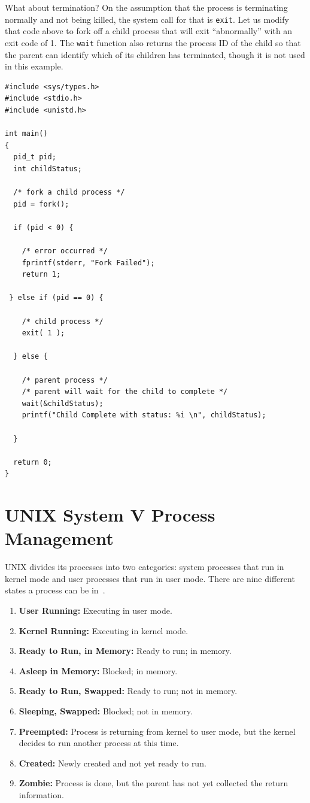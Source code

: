 What about termination? On the assumption that the process is terminating normally and not being killed, the system call for that is \texttt{exit}. Let us modify that code above to fork off a child process that will exit ``abnormally'' with an exit code of 1. The \texttt{wait} function also returns the process ID of the child so that the parent can identify which of its children has terminated, though it is not used in this example.


\begin{verbatim}
#include <sys/types.h>
#include <stdio.h> 
#include <unistd.h>

int main()
{
  pid_t pid;
  int childStatus;

  /* fork a child process */
  pid = fork();
  
  if (pid < 0) { 
  
    /* error occurred */ 
    fprintf(stderr, "Fork Failed"); 
    return 1;
    
 } else if (pid == 0) { 
    
    /* child process */
    exit( 1 );
    
  } else { 
    
    /* parent process */
    /* parent will wait for the child to complete */
    wait(&childStatus);
    printf("Child Complete with status: %i \n", childStatus);
    
  }
    
  return 0;
}
\end{verbatim}

\section*{UNIX System V Process Management}

UNIX divides its processes into two categories: system processes that run in kernel mode and user processes that run in user mode. There are nine different states a process can be in~\cite{osi}.

\begin{enumerate}
	\item \textbf{User Running:} Executing in user mode.
	\item \textbf{Kernel Running:} Executing in kernel mode.
	\item \textbf{Ready to Run, in Memory:} Ready to run; in memory.
	\item \textbf{Asleep in Memory:} Blocked; in memory.
	\item \textbf{Ready to Run, Swapped:} Ready to run; not in memory.
	\item \textbf{Sleeping, Swapped:} Blocked; not in memory.
	\item \textbf{Preempted:} Process is returning from kernel to user mode, but the kernel decides to run another process at this time.
	\item \textbf{Created:} Newly created and not yet ready to run.
	\item \textbf{Zombie:} Process is done, but the parent has not yet collected the return information.
\end{enumerate}


